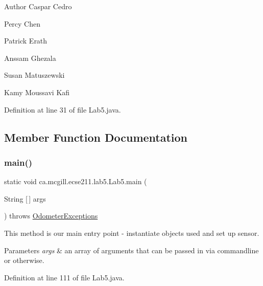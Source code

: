 \begin{DoxyAuthor}{Author}
Caspar Cedro 

Percy Chen 

Patrick Erath 

Anssam Ghezala 

Susan Matuszewski 

Kamy Moussavi Kafi 
\end{DoxyAuthor}


Definition at line 31 of file Lab5.\+java.



\subsection{Member Function Documentation}
\mbox{\label{classca_1_1mcgill_1_1ecse211_1_1lab5_1_1_lab5_a82cca51f550ed0eb016bb2082d3fe755}} 
\subsubsection{\texorpdfstring{main()}{main()}}
{\footnotesize\ttfamily static void ca.\+mcgill.\+ecse211.\+lab5.\+Lab5.\+main (\begin{DoxyParamCaption}\item[{String \mbox{[}$\,$\mbox{]}}]{args }\end{DoxyParamCaption}) throws \hyperlink{classca_1_1mcgill_1_1ecse211_1_1odometer_1_1_odometer_exceptions}{Odometer\+Exceptions}\hspace{0.3cm}{\ttfamily [static]}}

This method is our main entry point -\/ instantiate objects used and set up sensor.


\begin{DoxyParams}{Parameters}
{\em args} & an array of arguments that can be passed in via commandline or otherwise. \\
\hline
\end{DoxyParams}


Definition at line 111 of file Lab5.\+java.

